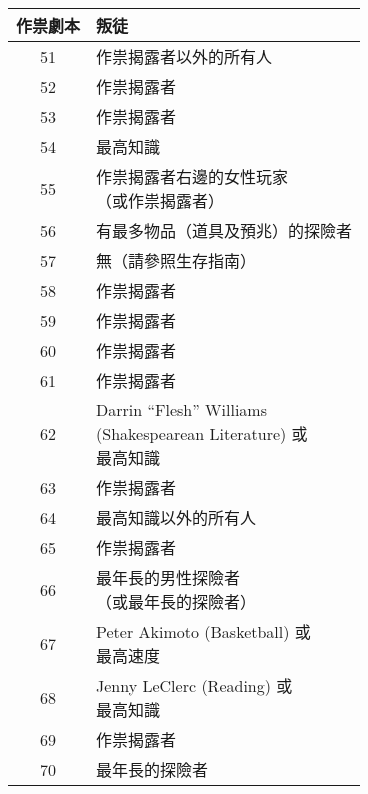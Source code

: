 \begin{center}
	\begin{minipage}[t]{.45\textwidth}
		\renewcommand{\arraystretch}{1.5}
		\begin{tabular}[t]{ c l }
			\toprule
			\bfseries 作祟劇本 & \bfseries 叛徒                               \\[.5ex]
			\midrule
			51             & 作祟揭露者以外的所有人                                \\
			52             & 作祟揭露者                                      \\
			53             & 作祟揭露者                                      \\
			54             & 最高知識                                       \\
			55             & \makecell[tl]{作祟揭露者右邊的女性玩家                 \\ （或作祟揭露者）} \\

			56             & 有最多物品（道具及預兆）的探險者                           \\
			57             & 無（請參照生存指南）                                 \\
			58             & 作祟揭露者                                      \\
			59             & 作祟揭露者                                      \\
			60             & 作祟揭露者                                      \\

			61             & 作祟揭露者                                      \\
			62             & \makecell[tl]{Darrin ``Flesh'' Williams    \\ (Shakespearean Literature) 或 \\ 最高知識 } \\
			63             & 作祟揭露者                                      \\
			64             & 最高知識以外的所有人                                 \\
			65             & 作祟揭露者                                      \\

			66             & \makecell[tl]{最年長的男性探險者                    \\ （或最年長的探險者）} \\
			67             & \makecell[tl]{Peter Akimoto (Basketball) 或 \\ 最高速度 } \\
			68             & \makecell[tl]{Jenny LeClerc (Reading) 或    \\ 最高知識 } \\
			69             & 作祟揭露者                                      \\
			70             & 最年長的探險者                                    \\


\end{tabular}
\end{minipage}
\end{center}
